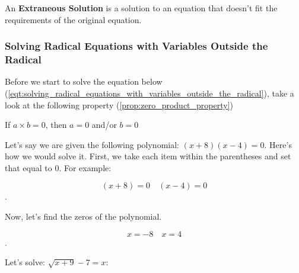 \begin{definition}
  \label{def:extraneous_solution}

  An \textbf{Extraneous Solution} is a solution to an equation that doesn't fit
  the requirements of the original equation.
\end{definition}


\subsubsection{Solving Radical Equations with Variables Outside the Radical}
\label{sub_sub_sec:solving_radical_equations_with_variables_outside_the_radical}

Before we start to solve the equation below
(\ref{eqt:solving_radical_equations_with_variables_outside_the_radical}), take
a look at the following property (\ref{prop:zero_product_property})

\begin{property}
  \label{prop:zero_product_property}

  If $a \times b = 0$, then $a = 0$ and/or $b = 0$

  Let's say we are given the following polynomial: $(x + 8)(x - 4) = 0$. Here's
  how we would solve it. First, we take each item within the parentheses and set
  that equal to $0$. For example:

  \[ (x + 8) = 0 \quad (x - 4) = 0 \].

  Now, let's find the zeros of the polynomial.

  \[ x = -8 \quad x = 4 \].
\end{property}

Let's solve: $\sqrt{x + 9} - 7 = x$:

